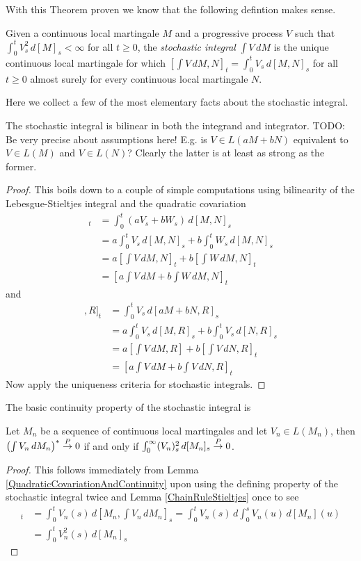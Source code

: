 With this Theorem proven we know that the following defintion makes sense.
\begin{defn}Given a continuous local martingale $M$ and a progressive process $V$ such that $\int_0^t V^2_s \, d[M]_s < \infty$ for all $t \geq 0$, the \emph{stochastic integral} $\int V \, dM$ is the unique continuous local martingale for which $[\int V \, dM, N]_t = \int_0^t V_s \, d[M,N]_s$ for all $t \geq 0$ almost surely for every continuous local martingale $N$.
\end{defn}

Here we collect a few of the most elementary facts about the stochastic integral.
\begin{lem}The stochastic integral is bilinear in both the integrand and integrator.
TODO: Be very precise about assumptions here!  E.g. is $V \in L(aM + bN)$ equivalent to $V \in L(M)$ and $V \in L(N)$?  Clearly the latter is at least as strong as the former.
\end{lem}
\begin{proof}
This boils down to a couple of simple computations using bilinearity of the Lebesgue-Stieltjes integral and the quadratic covariation
\begin{align*}
[\int (aV + bU) \, dM, N]_t &= \int_0^t (aV_s + bW_s) \, d[M,N]_s \\
&= a\int_0^t V_s \, d[M,N]_s + b\int_0^t W_s \, d[M,N]_s \\
&= a[\int V \, dM, N]_t + b[\int W \, dM, N]_t \\
&= [a\int V \, dM + b\int W \, dM, N]_t
\end{align*}
and
\begin{align*}
[\int V \, d[aM + bN], R]_t &= \int_0^t V_s \, d[aM+bN, R]_s \\
&= a\int_0^t V_s \, d[M, R]_s + b\int_0^t V_s \, d[N, R]_s \\
&= a[\int V \, dM, R] + b[\int V \, dN, R]_t \\
&= [a\int V \, dM + b\int V \, dN, R]_t
\end{align*}
Now apply the uniqueness criteria for stochastic integrals.
\end{proof}

The basic continuity property of the stochastic integral is
\begin{lem}\label{LimitsOfStochasticIntegralContinuousLocalMartingale}Let $M_n$ be a sequence of continuous local martingales and let $V_n \in L(M_n)$, then 
$\left( \int V_n \, dM_n \right)^* \overset{P}\to 0$ if and only if $\int_0^\infty (V_n)_s^2 \, d[M_n]_s \overset{P}\to 0$.
\end{lem}
\begin{proof}
This follows immediately from Lemma \ref{QuadraticCovariationAndContinuity} upon using the defining property of the stochastic integral twice and Lemma \ref{ChainRuleStieltjes} once to see
\begin{align*}
[\int V_n \, dM_n]_t &= \int_0^t V_n(s) \, d[M_n, \int V_n \, dM_n]_s = \int_0^t V_n(s) \, d\int_0^s V_n(u) \, d[M_n](u) \\
&= \int_0^t V_n^2(s) \, d[M_n]_s
\end{align*}
\end{proof}


